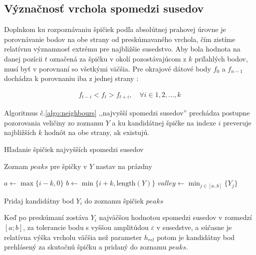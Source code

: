 \subsection{Význačnosť vrchola spomedzi susedov}
Doplnkom ku rozpoznávaniu špičiek podľa absolútnej prahovej úrovne je porovnávanie bodov na
obe strany od preskúmavaného vrchola, čím zistíme relatívnu významnosť extrému pre najbližšie susedstvo.
Aby bola hodnota na danej pozícii $t$ označená za špičku v okolí pozostávajúcom z $k$ priľahlých bodov,
musí byť v porovnaní so všetkými väčšia. Pre okrajové dátové body $f_0$ a $f_{n-1}$ dochádza k porovnaniu
iba z jednej strany \cite{survey-peaks-valleys}:
\begin{ceqn}\begin{align}
f_{t-i} < f_t > f_{t+i},\quad \forall i \in 1, 2, ..., k
\end{align}\end{ceqn}

Algoritmus č.\ref{algo:neighbours} ,,najvyšší spomedzi susedov'' \cite{peak-finding}
prechádza postupne pozorovania veličiny zo zoznamu $Y$ a ku kandidátnej špičke na indexe $i$ preveruje najbližších
$k$ hodnôt na obe strany, ak existujú.
\begin{algorithm}[h]
\caption{Hľadanie špičiek najvyšších spomedzi susedov}
\begin{algorithmic}[1]

\State Zoznam $peaks$ pre špičky v $Y$ nastav na prázdny

	\State $a \gets \max\{i - k, 0\}$
	\State $b \gets \min\{i + k, \mathrm{length}(Y)\}$
	\State $valley \gets \min_{j \in [a..b]}\{Y_j\}$

	 

			\State Pridaj kandidátny bod $Y_i$ do zoznamu špičiek $peaks$
		\EndIf
	\EndIf
\EndFor
\end{algorithmic}
\label{algo:neighbours}
\end{algorithm}

Keď po preskúmaní zostáva $Y_i$ najväčšou hodnotou spomedzi susedov
v rozmedzí $[a; b]$, za tolerancie bodu s vyššou amplitúdou $\varepsilon$ v susedstve, a súčasne je relatívna
výška vrcholu väčšia než parameter $h_{rel}$ potom je kandidátny bod prehlásený
za skutočnú špičku a pridaný do zoznamu $peaks$.

